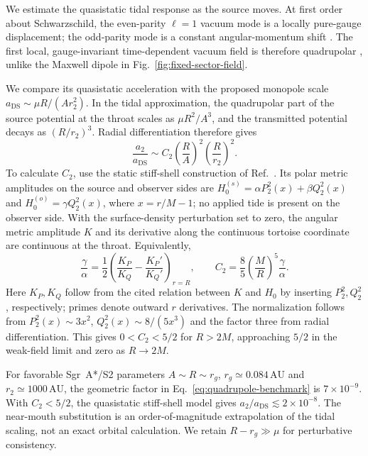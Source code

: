 \documentclass[aps,prd,10pt,onecolumn,nofootinbib,superscriptaddress,floatfix]{revtex4-2}
\begin{document}
We estimate the quasistatic tidal response as the source moves.  At first
order about Schwarzschild, the even-parity $\ell=1$ vacuum mode is a
locally pure-gauge displacement; the odd-parity mode is a constant
angular-momentum shift \cite{MartelPoisson2005SchwarzschildPerturbations}.
The first local, gauge-invariant time-dependent vacuum field is therefore
quadrupolar \cite{Thorne1980Multipole}, unlike the Maxwell dipole in
Fig.~\ref{fig:fixed-sector-field}.

We compare its quasistatic acceleration with the proposed monopole scale
$a_{\mathrm{DS}}\sim\mu R/(Ar_2^2)$.
In the tidal approximation, the quadrupolar part of the source potential
at the throat scales as $\mu R^2/A^3$, and the transmitted potential
decays as $(R/r_2)^3$.
Radial differentiation therefore gives
\begin{equation}
 \frac{a_2}{a_{\mathrm{DS}}}
 \sim C_2\left(\frac{R}{A}\right)^2
          \left(\frac{R}{r_2}\right)^2.
 \label{eq:quadrupole-benchmark}
\end{equation}
To calculate $C_2$, use the static stiff-shell construction of
Ref.~\cite[Appendix~D.1]{CardosoEtAl2017LoveNumbers}.  Its polar metric
amplitudes on the source and observer sides are
$H_0^{(s)}=\alpha P_2^2(x)+\beta Q_2^2(x)$ and
$H_0^{(o)}=\gamma Q_2^2(x)$, where $x=r/M-1$; no applied tide is present
on the observer side.  With the surface-density perturbation set to zero,
the angular metric amplitude $K$ and its derivative along the continuous
tortoise coordinate are continuous at the throat.  Equivalently,
\begin{equation}
 \frac{\gamma}{\alpha}
 =\frac12\left(\frac{K_P}{K_Q}-\frac{K_P'}{K_Q'}\right)_{r=R},
 \qquad
 C_2=\frac85\left(\frac{M}{R}\right)^5\frac{\gamma}{\alpha}.
 \label{eq:quadrupole-transfer}
\end{equation}
Here $K_P,K_Q$ follow from the cited relation between $K$ and $H_0$ by
inserting $P_2^2,Q_2^2$, respectively; primes denote outward $r$ derivatives.
The normalization follows from $P_2^2(x)\sim3x^2$,
$Q_2^2(x)\sim8/(5x^3)$ and the factor three from radial differentiation.
This gives $0<C_2<5/2$ for $R>2M$, approaching $5/2$ in the weak-field
limit and zero as $R\to2M$.

For favorable Sgr~A*/S2 parameters $A\sim R\sim r_g$,
$r_g\simeq0.084\,\mathrm{AU}$ and $r_2\simeq1000\,\mathrm{AU}$,
the geometric factor in Eq.~\eqref{eq:quadrupole-benchmark} is
$7\times10^{-9}$.  With $C_2<5/2$, the quasistatic stiff-shell model
gives $a_2/a_{\mathrm{DS}}\lesssim2\times10^{-8}$.
The near-mouth substitution is an order-of-magnitude extrapolation of
the tidal scaling, not an exact orbital calculation.
We retain $R-r_g\gg\mu$ for perturbative consistency.



\end{document}

